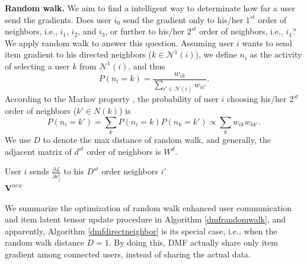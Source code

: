 \textbf{Random walk. }
We aim to find a intelligent way to determinate how far a user send the gradients. 
Does user $i_0$ send the gradient only to his/her $1^{st}$ order of neighbors, i.e., $i_1$, $i_2$, and $i_3$, or further to his/her $2^{st}$ order of neighbors, i.e., $i_4$? 
We apply random walk to answer this question. 
Assuming user $i$ wants to send item gradient to his directed neighbors ($k \in \mathcal{N}^1(i)$), we define $n_i$ as the activity of selecting a user $k$ from $\mathcal{N}^1(i)$, and thus 
\begin{equation}
P(n_i = k) = \frac{w_{ik}}{\sum\limits_{i' \in \mathcal{N}(i)}{w_{ii'}}}. 
\end{equation} 
According to the Markov property \cite{aldous2002reversible}, the probability of user $i$ choosing his/her $2^{st}$ order of neighbors ($k' \in N(k)$) is
\begin{equation}
P(n_i = k') = \sum\limits_{k} P(n_i = k)  P(n_k = k') \propto \sum\limits_{k} w_{ik} w_{kk'}. 
\end{equation} 
We use $D$ to denote the max distance of random walk, and generally, the adjacent matrix of $d^{st}$ order of neighbors is $W^d$. 

\begin{algorithm}[t]
\caption{Random walk enhanced user communication and item latent tensor update}\label{dmfrandomwalk}
User $i$ sends $\frac{\partial \mathcal{L}}{\partial v^i_j}$ to his $D^{st}$ order neighbors $i'$\\
\Return $\textbf{V}^{new}$
\end{algorithm}

We summarize the optimization of random walk enhanced user communication and item latent tensor update procedure in Algorithm \ref{dmfrandomwalk}, and apparently, Algorithm \ref{dmfdirectneighbor} is its special case, i.e., when the random walk distance $D=1$. 
By doing this, DMF actually share only item gradient among connected users, instead of sharing the actual data. 



